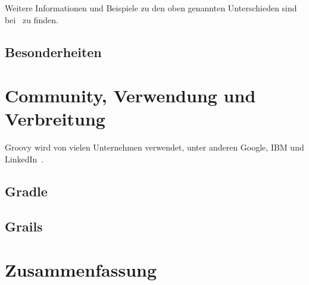 \documentclass[11pt,a4paper]{article}
\begin{document}
	Weitere Informationen und Beispiele zu den oben genannten Unterschieden sind bei~\cite{groovy-lang:differences} zu finden.

	\subsection{Besonderheiten}\label{subsec:besonderheiten}


	\section{Community, Verwendung und Verbreitung}\label{sec:community}

	Groovy wird von vielen Unternehmen verwendet, unter anderen Google, IBM und LinkedIn~\cite{groovy-lang:main,wiki:Groovy}.

	\subsection{Gradle}\label{subsec:gradle}

	\subsection{Grails}\label{subsec:grails}


	\section{Zusammenfassung}\label{sec:zusammenfassung}


	
	

\end{document}
